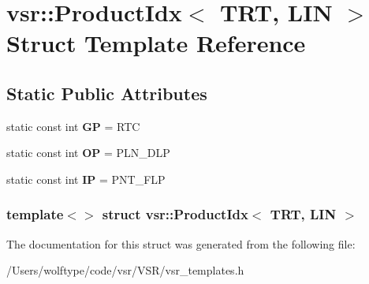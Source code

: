 \hypertarget{structvsr_1_1_product_idx_3_01_t_r_t_00_01_l_i_n_01_4}{\section{vsr\-:\-:Product\-Idx$<$ T\-R\-T, L\-I\-N $>$ Struct Template Reference}
\label{structvsr_1_1_product_idx_3_01_t_r_t_00_01_l_i_n_01_4}
}
\subsection*{Static Public Attributes}
\begin{DoxyCompactItemize}
\item 
\hypertarget{structvsr_1_1_product_idx_3_01_t_r_t_00_01_l_i_n_01_4_ac991d8526d2da02ea23ec3be3fd9cb1a}{static const int {\bfseries G\-P} = R\-T\-C}\label{structvsr_1_1_product_idx_3_01_t_r_t_00_01_l_i_n_01_4_ac991d8526d2da02ea23ec3be3fd9cb1a}

\item 
\hypertarget{structvsr_1_1_product_idx_3_01_t_r_t_00_01_l_i_n_01_4_a7b8bdcc06ccfe0f97370a16f65a91e73}{static const int {\bfseries O\-P} = P\-L\-N\-\_\-\-D\-L\-P}\label{structvsr_1_1_product_idx_3_01_t_r_t_00_01_l_i_n_01_4_a7b8bdcc06ccfe0f97370a16f65a91e73}

\item 
\hypertarget{structvsr_1_1_product_idx_3_01_t_r_t_00_01_l_i_n_01_4_a5906298df83378de06260480b5f54849}{static const int {\bfseries I\-P} = P\-N\-T\-\_\-\-F\-L\-P}\label{structvsr_1_1_product_idx_3_01_t_r_t_00_01_l_i_n_01_4_a5906298df83378de06260480b5f54849}

\end{DoxyCompactItemize}
\subsubsection*{template$<$$>$ struct vsr\-::\-Product\-Idx$<$ T\-R\-T, L\-I\-N $>$}



The documentation for this struct was generated from the following file\-:\begin{DoxyCompactItemize}
\item 
/\-Users/wolftype/code/vsr/\-V\-S\-R/vsr\-\_\-templates.\-h\end{DoxyCompactItemize}
